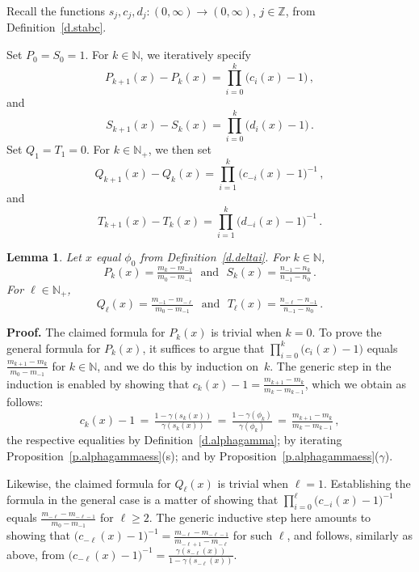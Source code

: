\documentclass[letterpaper,11pt,oneside,reqno]{amsbook}
\newcommand{\N}{\ensuremath{\mathbb{N}}}
\newcommand{\Z}{\ensuremath{\mathbb{Z}}}
\numberwithin{figure}{chapter}
\newtheorem{lemma}[theorem]{Lemma}
\theoremstyle{definition}
\theoremstyle{definition}
\theoremstyle{definition}
\theoremstyle{definition}
\theoremstyle{definition}
\newcommand{\nwithzero}{\N}
\newcommand{\nwithoutzero}{\N_+}
\newcommand{\macsee}{c}
\newcommand{\macdee}{d}
\newcommand{\macphi}{\phi}
\newcommand{\macgsee}{\gamma}
\begin{document}
Recall the functions  $s_j,\macsee_j,\macdee_j:(0,\infty) \to (0,\infty)$, $j \in \Z$, from Definition~\ref{d.stabc}.

Set $P_0 = S_0 = 1$. For $k \in \nwithzero$, we iteratively specify 
\begin{equation}\label{e.prodp}
 P_{k+1}(x) - P_k(x) = \prod_{i=0}^k \big( \macsee_i(x)  - 1 \big) \, ,
\end{equation}
and
\begin{equation}\label{e.prods}
 S_{k+1}(x) - S_k(x) = \prod_{i=0}^k \big( \macdee_i(x) - 1 \big) \, .
\end{equation}
Set $Q_1 = T_1 = 0$. For  $k \in \nwithoutzero$, we then set
\begin{equation}\label{e.prodq}
 Q_{k+1}(x) - Q_k(x) = \prod_{i=1}^k \big( \macsee_{-i}(x) - 1 \big)^{-1} \, ,
\end{equation}
and
\begin{equation}\label{e.prodt}
 T_{k+1}(x) - T_k(x) = \prod_{i=1}^k \big( \macdee_{-i}(x) - 1 \big)^{-1} \, .
\end{equation}
\begin{lemma}\label{l.prodinterpret}
Let $x$ equal $\macphi_0$ from Definition~\ref{d.deltai}. For $k \in \nwithzero$, 
$$
P_k(x) = \tfrac{m_k - m_{-1}}{m_0 - m_{-1}} \, \, \, \, \textrm{and} \, \, \, \,    
S_k(x) = \tfrac{n_{-1} - n_k}{n_{-1} - n_0} \, .
$$
For $\ell \in \nwithoutzero$,
$$
Q_\ell(x) = \tfrac{m_{-1} - m_{-\ell}}{m_0 - m_{-1}}   \, \, \, \, \textrm{and} \, \, \, \,    
T_\ell(x) = \tfrac{n_{-\ell} - n_{-1}}{n_{-1} - n_0}  \, .
$$
\end{lemma}
{\bf Proof.}
 The claimed formula for $P_k(x)$ is trivial when $k=0$. To prove the general formula for $P_k(x)$, it suffices to argue that $\prod_{i=0}^k \big( \macsee_i(x)  - 1 \big)$
 equals $\tfrac{m_{k+1} - m_k}{m_0 - m_{-1}}$ for $k \in \nwithzero$, and we do this by induction on~$k$. The generic step in the induction is enabled by showing that $\macsee_k(x) -1 = \tfrac{m_{k+1} - m_k}{m_k - m_{k-1}}$, which we obtain as follows: 
 $$
 \macsee_k(x) -1 \, = \, \tfrac{1 - \macgsee(s_k(x))}{\macgsee(s_k(x))} \, = \, \tfrac{1 - \macgsee(\macphi_k)}{\macgsee(\macphi_k)} \, = \, \tfrac{m_{k+1} - m_k}{m_k - m_{k-1}} \, , 
 $$
 the respective equalities by Definition~\ref{d.alphagamma}; by iterating Proposition~\ref{p.alphagammaess}(s); and  by Proposition~\ref{p.alphagammaess}($\macgsee$).
 
 Likewise, the claimed formula for $Q_\ell(x)$ is trivial when $\ell=1$.
 Establishing the formula in the general case is a matter of showing that  $\prod_{i=0}^\ell \big( \macsee_{-i}(x)  - 1 \big)^{-1}$ equals  $\tfrac{m_{-\ell} - m_{-\ell-1}}{m_0 - m_{-1}}$ for $\ell \geq 2$.
 The generic inductive step here amounts to showing that $\big( \macsee_{-\ell}(x)  - 1 \big)^{-1} = \tfrac{m_{-\ell} - m_{-\ell-1}}{m_{-\ell + 1} - m_{-\ell}}$ for such $\ell$, and follows, similarly as above, from
 $\big( \macsee_{-\ell}(x)  - 1 \big)^{-1} =  \tfrac{\macgsee(s_{-\ell}(x))}{1-\macgsee(s_{-\ell}(x))}$.
 
\end{document}
